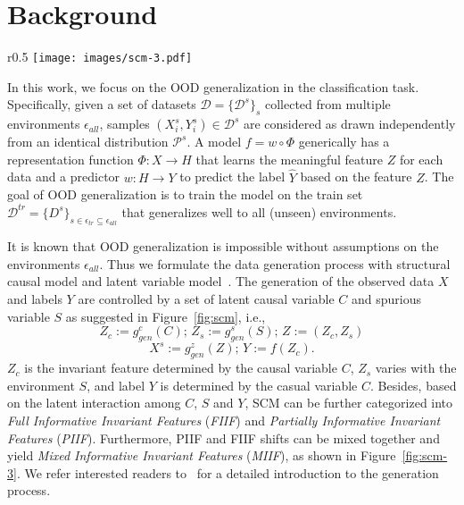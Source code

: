 \section{Background}

\begin{wrapfigure}{r}{0.5\textwidth} %
  \centering
  \texttt{[image: images/scm-3.pdf]} %
  \caption{Illustrations of three structural causal
models (SCMs).} %
\label{fig:scm-3}
\end{wrapfigure}

In this work, we focus on the OOD generalization in the classification task. 
Specifically,
given a set of datasets $\mathcal{D}=\{\mathcal{D}^s\}_s$ collected from multiple environments $\epsilon_{all}$, samples $(X^s_i, Y^s_i)\in \mathcal{D}^s$ are considered as drawn independently from an identical distribution $\mathcal{P}^s$.
A model $ f=w \circ \Phi$  generically has a representation function $\Phi: X \rightarrow H$ that learns the meaningful feature $Z$ for each data and a predictor $w: H \rightarrow Y$ to predict the label $\hat{Y}$ based on the feature $Z$.
The goal of OOD generalization is to train the model on the train set $\mathcal{D}^{tr}=\{D^s\}_{s \in \epsilon_{tr} \subseteq \epsilon_{all}}$ that generalizes well to all (unseen) environments.


It is known that OOD generalization is impossible without assumptions on the environments $\epsilon_{all}$. Thus we formulate the data generation process with structural causal model and latent variable model~\cite{PearlCausality}.
The generation of the observed data $X$ and labels $Y$ are controlled by a set of latent causal variable $C$ and spurious variable $S$ as suggested in Figure~\ref{fig:scm}, i.e.,
\[Z_c := g_{gen}^c(C); \, Z_s := g_{gen}^s(S); \, Z:=(Z_c,Z_s) \]
\[X^s:= g_{gen}^z(Z);\, Y:= f(Z_c).\]
$Z_c$ is the invariant feature determined by the causal variable $C$, 
$Z_s$ varies with the environment $S$, and label $Y$ is determined by the casual variable $C$. 
Besides, based on the latent interaction among $C$, $S$ and $Y$, SCM can be further categorized into \emph{Full Informative Invariant Features} (\emph{FIIF}) and \emph{Partially Informative Invariant Features} (\emph{PIIF}).
Furthermore, PIIF and FIIF shifts can be mixed together and yield \emph{Mixed Informative Invariant Features} (\emph{MIIF}), as shown in Figure~\ref{fig:scm-3}.
We refer interested readers to~\citet{ib-irm} for a detailed introduction to the generation process.

